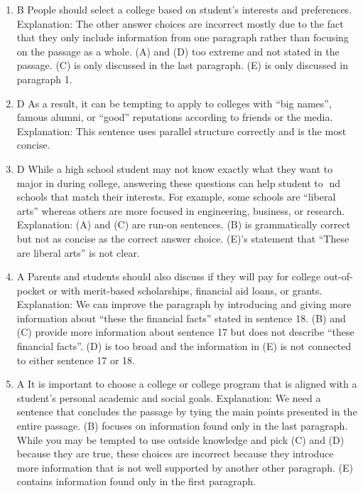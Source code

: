 \begin{enumerate}
\item B People should select a college based on student's interests and preferences. Explanation: The other answer choices are incorrect mostly due to the fact that they only include information from one paragraph rather than focusing on the passage as a whole. (A) and (D) too extreme and not stated in the passage. (C) is only discussed in the last paragraph. (E) is only discussed in paragraph 1. 
\item D As a result, it can be tempting to apply to colleges with ``big names'', famous alumni, or ``good'' reputations according to friends or the media. Explanation: This sentence uses parallel structure correctly and is the most concise. 
\item D While a high school student may not know exactly what they want to major in during college, answering these questions can help student to nd schools that match their interests. For example, some schools are ``liberal arts'' whereas others are more focused in engineering, business, or research. Explanation: (A) and (C) are run-on sentences. (B) is grammatically correct but not as concise as the correct answer choice. (E)'s statement that ``These are liberal arts'' is not clear.
\item A Parents and students should also discuss if they will pay for college out-of-pocket or with merit-based scholarships, financial aid loans, or grants. Explanation: We can improve the paragraph by introducing and giving more information about ``these the financial facts'' stated in sentence 18. (B) and (C) provide more information about sentence 17 but does not describe ``these financial facts''. (D) is too broad and the information in (E) is not connected to either sentence 17 or 18.
\item A It is important to choose a college or college program that is aligned with a student's personal academic and social goals. Explanation:  We need a sentence that concludes the passage by tying the main points presented in the entire passage. (B) focuses on information found only in the last paragraph. While you may be tempted to use outside knowledge and pick (C) and (D) because they are true, these choices are incorrect because they introduce more information that is not well supported by another other paragraph. (E) contains information found only in the first paragraph.




\end{enumerate}
